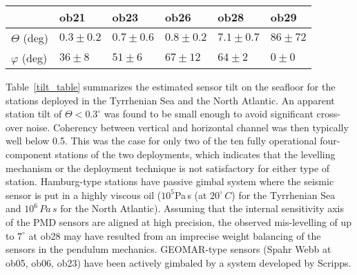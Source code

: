 \documentclass{article}
\begin{document}
{\begin{table}
\begin{center}
\vskip0.5cm
\begin{tabular}{|l||l|l|l|l|l|}
\hline
& ob21 & ob23 & ob26 & ob28 & ob29 \\
\hline
$\Theta$ (deg) &  
 $0.3 \pm 0.2  $ &
 $0.7 \pm 0.6 $ &
 $0.8 \pm 0.2 $ &
 $7.1  \pm  0.7 $ &
 $86 \pm  72  $ 
\\
\hline
$\varphi$ (deg) &  
 $36 \pm  8 $ &
 $51 \pm  6 $ &
 $67\pm 12$ &
 $64 \pm  2 $ &
 $0 \pm 0 $ 
\\
\hline
\end{tabular}
\end{center}
\end{table}
Table~\ref{tilt_table} summarizes the estimated sensor 
tilt on the seafloor for the stations deployed in the 
Tyrrhenian Sea and the North Atlantic.
An apparent  station tilt of $\Theta < 0.3^{\circ}$
was found to be small enough to avoid significant cross-over noise.
Coherency between vertical and horizontal channel was then 
typically well below 0.5. This was the case
for only two of the 
ten fully operational four-component stations of the two deployments, which
 indicates that the levelling mechanism or the 
deployment technique 
is not satisfactory for either type of station.
Hamburg-type stations have passive gimbal system where the 
seismic sensor is put in a highly viscous oil 
($10^5$Pa$\,$s (at $20^{\circ}\, C$) for the Tyrrhenian Sea and $10^6 \, Pa\,s$ for the North Atlantic).
Assuming that the internal sensitivity axis of the PMD sensors are 
aligned at high precision, 
the observed mis-levelling of up to $7^{\circ}$ at ob28 
may have resulted from 
an imprecise weight balancing of the sensors in
the pendulum mechanics. 
GEOMAR-type sensors (Spahr Webb at ob05, ob06, ob23) 
have been actively gimbaled by a system developed by Scripps.
}
\end{document}
